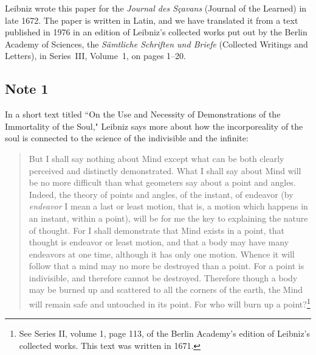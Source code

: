 \documentclass[polutonikogreek,english,twoside,openright]{article}
\begin{document}
Leibniz wrote this paper for the {\em Journal des S\c{c}avans} (Journal of the Learned) in late 1672.   The paper is written in Latin, and we have translated it from a text published in 1976 in an edition of Leibniz's collected works put out by the Berlin Academy of Sciences, the  {\em S\"{a}mtliche Schriften und Briefe} (Collected Writings and Letters), in Series~III, Volume~1, on pages 1--20. 

\subsection*{Note 1}
\label{caa1}

In a short text titled ``On the Use and Necessity of Demonstrations of the Immortality of the Soul," Leibniz says more about how the incorporeality of the soul is connected to the science of the indivisible and the infinite:
\begin{quote}
But I shall say nothing about Mind except what can be both clearly perceived and distinctly demonstrated.  What I shall say about Mind will be no more difficult than what geometers say about a point and angles.  Indeed, the theory of points and angles, of the instant, of endeavor (by {\em endeavor} I mean a last or least motion, that is, a motion which happens in an instant, within a point), will be for me the key to explaining the nature of thought.  For I shall demonstrate that Mind exists in a point, that thought is endeavor or least motion, and that a body may have many endeavors at one time, although it has only one motion.  Whence it will follow that a mind may no more be destroyed than a point.  For a point is indivisible, and therefore cannot be destroyed.  Therefore though a body may be burned up and scattered to all the corners of the earth, the Mind will remain safe and untouched in its point.  For who will burn up a point?\footnote{See Series II, volume 1, page 113, of the Berlin Academy's edition of Leibniz's collected works. This text was written in 1671.} 
\end{quote}
\end{document}

